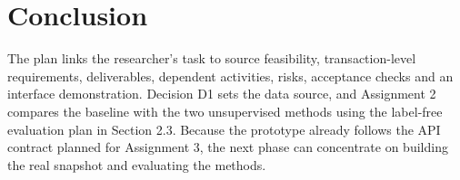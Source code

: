 \section{Conclusion}
\label{sec:conclusion}

The plan links the researcher's task to source feasibility, transaction-level requirements, deliverables, dependent activities, risks, acceptance checks and an interface demonstration. Decision D1 sets the data source, and Assignment 2 compares the baseline with the two unsupervised methods using the label-free evaluation plan in Section 2.3. Because the prototype already follows the API contract planned for Assignment 3, the next phase can concentrate on building the real snapshot and evaluating the methods.
